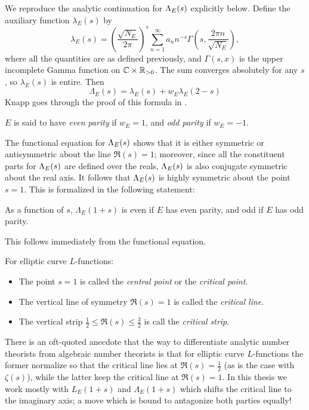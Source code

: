 We reproduce the analytic continuation for $\Lambda_E(s)$ explicitly below. Define the auxiliary function $\lambda_E(s)$ by
\begin{equation}\label{eqn:Lams_analytic_continuation}
\lambda_E(s) = \left(\frac{\sqrt{N_E}}{2\pi}\right)^{s} \sum_{n=1}^\infty a_n n^{-s}\Gamma \left(s,\frac{2\pi n}{\sqrt{N_E}}\right),
\end{equation}
where all the quantities are as defined previously, and $\Gamma(s,x)$ is the upper incomplete Gamma function on $\mathbb{C}\times \mathbb{R}_{>0}$. The sum converges absolutely for any $s$, so $\lambda_E(s)$ is entire. Then
\begin{equation}
\Lambda_E(s) = \lambda_E(s) + w_E \lambda_E(2-s)
\end{equation}
Knapp goes through the proof of this formula in \cite[pp. 270-271]{Kna-1992}. \\

\begin{definition}
$E$ is said to have {\it even parity} if $w_E = 1$, and {\it odd parity} if $w_E = -1$.
\end{definition}

The functional equation for $\Lambda_E(s)$ shows that it is either symmetric or antisymmetric about the line $\Re(s) = 1$; moreover, since all the constituent parts for $\Lambda_E(s)$ are defined over the reals, $\Lambda_E(s)$ is also conjugate symmetric about the real axis. It follows that $\Lambda_E(s)$ is highly symmetric about the point $s=1$. This is formalized in the following statement:
\begin{proposition}
As a function of $s$, $\Lambda_E(1+s)$ is even if $E$ has even parity, and odd if $E$ has odd parity.
\end{proposition}
This follows immediately from the functional equation. \\

\begin{definition} For elliptic curve $L$-functions:
\begin{itemize}
\item The point $s=1$ is called the {\it central point} or the {\it critical point}.
\item The vertical line of symmetry $\Re(s)=1$ is called the {\it critical line}.
\item The vertical strip $\frac{1}{2} \le \Re(s) \le \frac{3}{2}$ is call the {\it critical strip}.
\end{itemize}
\end{definition}

There is an oft-quoted anecdote that the way to differentiate analytic number theorists from algebraic number theorists is that for elliptic curve $L$-functions the former normalize so that the critical line lies at $\Re(s) = \frac{1}{2}$ (as is the case with $\zeta(s)$), while the latter keep the critical line at $\Re(s)=1$. In this thesis we work mostly with $L_E(1+s)$ and $\Lambda_E(1+s)$ which shifts the critical line to the imaginary axis; a move which is bound to antagonize both parties equally! \\

